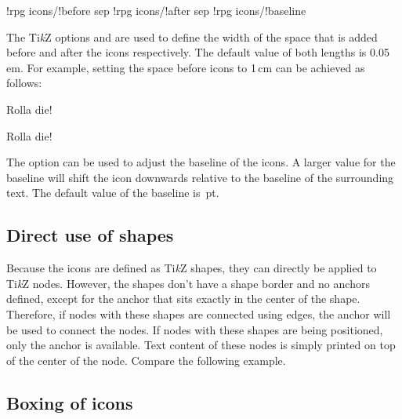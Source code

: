 \documentclass[a4paper]{article}
\begin{document}
\begin{macrodef}
!rpg icons/!before sep
!rpg icons/!after sep
!rpg icons/!baseline
\end{macrodef}
The Ti\emph{k}Z options  and  are used to define the width of the space that is added before and after the icons respectively. The default value of both lengths is 0.05\,em. For example, setting the space before icons to 1\,cm can be achieved as follows:

\begin{codeexample}
Rolla die!

Rolla die!
\end{codeexample}

The option  can be used to adjust the baseline of the icons. A larger value for the baseline will shift the icon downwards relative to the baseline of the surrounding text. The default value of the baseline is \,pt.

\subsection{Direct use of shapes}

Because the icons are defined as Ti\emph{k}Z shapes, they can directly be applied to Ti\emph{k}Z nodes. However, the shapes don't have a shape border and no anchors defined, except for the  anchor that sits exactly in the center of the shape. Therefore, if nodes with these shapes are connected using edges, the  anchor will be used to connect the nodes. If nodes with these shapes are being positioned, only the  anchor is available. Text content of these nodes is simply printed on top of the center of the node. Compare the following example.

\begin{codeexample}
\end{codeexample}

\subsection{Boxing of icons}
\end{document}
